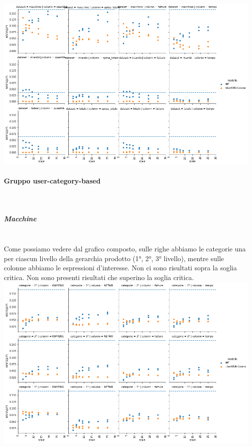 \includegraphics[width=16cm]{figures/risultati_ordered_singolo.png}

\paragraph{Gruppo user-category-based}\mbox{} \\
\subparagraph{Macchine}\mbox{} \\
Come possiamo vedere dal grafico composto, sulle righe abbiamo le categorie una per ciascun livello della gerarchia prodotto (1°, 2°, 3° livello), mentre sulle colonne abbiamo le espressioni d'interesse. Non ci sono risultati sopra la soglia critica. Non sono presenti risultati che superino la soglia critica.\\

\includegraphics[width=16cm]{figures/risultati_minmax_categoria_macchine.png}
\newpage

